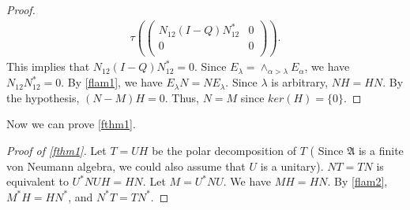 \documentclass[a4paper,10pt]{amsart}
\newcommand{\AAA}{\mathfrak A}
\begin{document}
\begin{proof}
\begin{align*}
    \tau \left(
    \begin{pmatrix} 
        N_{12}(I-Q)N_{12}^{*} & 0 \\
        0 & 0 \\
    \end{pmatrix}
    \right ).
\end{align*}
This implies that $N_{12}(I-Q)N_{12}^{*} = 0$. Since $E_{\lambda} = 
\wedge_{\alpha > \lambda} E_{\alpha}$, we have $N_{12}N^{*}_{12} = 0$.
By \cref{flam1}, we have $E_{\lambda}N = NE_{\lambda}$.
Since $\lambda$ is arbitrary, $NH = HN$. By the hypothesis, $(N-M)H = 0$.
Thus, $N=M$ since $ker(H)= \{0\}$.
\end{proof}

Now we can prove \cref{fthm1}.

\begin{proof}[Proof of \cref{fthm1}]
    Let $T = UH$ be the polar decomposition of $T$ (
    Since $\AAA$ is a finite von Neumann algebra, we could
    also assume that $U$ is a unitary). $NT = TN$ is equivalent to  
   $U^{*}NUH = HN$. Let $M = U^{*}NU$. We have $MH = HN$. By \cref{flam2},
   $M^{*}H = HN^{*}$, and $N^{*}T = T N^{*}$. 
\end{proof}
\end{document}
